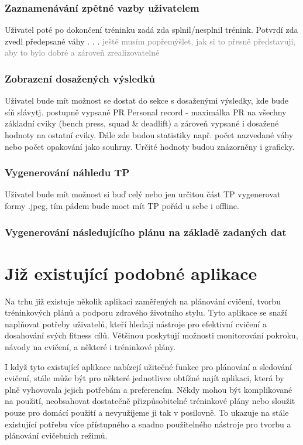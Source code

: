 \documentclass[
  field=inf,
  biblatex,
  glossaries,
  index
]{kidiplom}
\begin{document}
\subsubsection{Zaznamenávání zpětné vazby uživatelem}
Uživatel poté po dokončení tréninku zadá zda splnil/nesplnil trénink. Potvrdí zda zvedl předepsané váhy . . . 
\noindent\textcolor{gray}{ještě musím popřemýšlet, jak si to přesně představuji, aby to bylo dobré a zároveň zrealizovatelné}


\subsubsection{Zobrazení dosažených výsledků}
Uživatel bude mít možnost se dostat do sekce s dosaženými výsledky, kde bude \clqq síň slávy\crqq tj. postupně vypsané  {PR} {Personal record - maximálka} \gls{PR} na všechny základní cviky (bench press, squad \& deadlift) a zároveň vypsané i dosažené hodnoty na ostatní cviky. Dále zde budou statistiky např. počet nazvedané váhy nebo počet opakování jako souhrny. Určité hodnoty budou znázorněny i graficky.

\subsubsection{Vygenerování náhledu \gls{TP}}
Uživatel bude mít možnost si buď celý nebo jen určitou část \gls{TP} vygenerovat formy .jpeg, tím pádem bude moct mít \gls{TP} pořád u sebe i offline.

\subsubsection{Vygenerování následujícího plánu na základě zadaných dat} 


\section{Již existující podobné aplikace}
Na trhu již existuje několik aplikací zaměřených na plánování cvičení, tvorbu tréninkových plánů a podporu zdravého životního stylu. Tyto aplikace se snaží naplňovat potřeby uživatelů, kteří hledají nástroje pro efektivní cvičení a dosahování svých fitness cílů. Většinou poskytují možnosti monitorování pokroku, návody na cvičení, a některé i tréninkové plány.

I když tyto existující aplikace nabízejí užitečné funkce pro plánování a sledování cvičení, stále může být pro některé jednotlivce obtížné najít aplikaci, která by plně vyhovovala jejich potřebám a preferencím. Někdy mohou být komplikované na použití, neobsahovat dostatečně přizpůsobitelné tréninkové plány nebo sloužit pouze pro domácí použití a nevyužijeme ji tak v posilovně. To ukazuje na stále existující potřebu více přístupného a snadno použitelného nástroje pro tvorbu a plánování cvičebních režimů.
\end{document}
